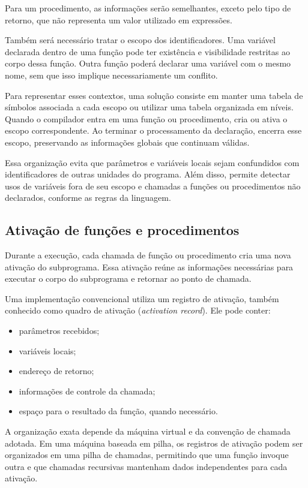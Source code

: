 \documentclass[
  brazilian,
  letterpaper,
]{book}
\providecommand{\tightlist}{%
  \setlength{\itemsep}{0pt}\setlength{\parskip}{0pt}}
\theoremstyle{plain}
\theoremstyle{definition}
\theoremstyle{remark}
\begin{document}
Para um procedimento, as informações serão semelhantes, exceto pelo tipo
de retorno, que não representa um valor utilizado em expressões.

Também será necessário tratar o escopo dos identificadores. Uma variável
declarada dentro de uma função pode ter existência e visibilidade
restritas ao corpo dessa função. Outra função poderá declarar uma
variável com o mesmo nome, sem que isso implique necessariamente um
conflito.

Para representar esses contextos, uma solução consiste em manter uma
tabela de símbolos associada a cada escopo ou utilizar uma tabela
organizada em níveis. Quando o compilador entra em uma função ou
procedimento, cria ou ativa o escopo correspondente. Ao terminar o
processamento da declaração, encerra esse escopo, preservando as
informações globais que continuam válidas.

Essa organização evita que parâmetros e variáveis locais sejam
confundidos com identificadores de outras unidades do programa. Além
disso, permite detectar usos de variáveis fora de seu escopo e chamadas
a funções ou procedimentos não declarados, conforme as regras da
linguagem.

\subsection{Ativação de funções e
procedimentos}\label{ativauxe7uxe3o-de-funuxe7uxf5es-e-procedimentos}

Durante a execução, cada chamada de função ou procedimento cria uma nova
ativação do subprograma. Essa ativação reúne as informações necessárias
para executar o corpo do subprograma e retornar ao ponto de chamada.

Uma implementação convencional utiliza um registro de ativação, também
conhecido como quadro de ativação (\emph{activation record}). Ele pode
conter:

\begin{itemize}
\tightlist
\item
  parâmetros recebidos;
\item
  variáveis locais;
\item
  endereço de retorno;
\item
  informações de controle da chamada;
\item
  espaço para o resultado da função, quando necessário.
\end{itemize}

A organização exata depende da máquina virtual e da convenção de chamada
adotada. Em uma máquina baseada em pilha, os registros de ativação podem
ser organizados em uma pilha de chamadas, permitindo que uma função
invoque outra e que chamadas recursivas mantenham dados independentes
para cada ativação.
\end{document}
